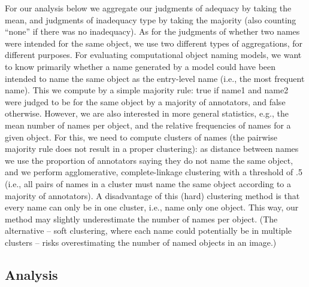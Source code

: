 For our analysis below we aggregate our judgments of adequacy by taking the mean, and judgments of inadequacy type by taking the majority (also counting ``none'' if there was no inadequacy).
As for the judgments of whether two names were intended for the same object, we use two different types of aggregations, for different purposes.
For evaluating computational object naming models, we want to know primarily whether a name generated by a model could have been intended to name the same object as the entry-level name (i.e., the most frequent name).
This we compute by a simple majority rule: true if name1 and name2 were judged to be for the same object by a majority of annotators, and false otherwise.
However, we are also interested in more general statistics, e.g., the mean number of names per object, and the relative frequencies of names for a given object.
For this, we need to compute clusters of names  (the pairwise majority rule does not result in a proper clustering): as distance between names we use the proportion of annotators saying they do not name the same object, and we perform agglomerative, complete-linkage clustering with a threshold of .5 (i.e., all pairs of names in a cluster must name the same object according to a majority of annotators).
A disadvantage of this (hard) clustering method is that every name can only be in one cluster, i.e., name only one object. 
This way, our method may slightly underestimate the number of names per object.
(The alternative -- soft clustering, where each name could potentially be in multiple clusters -- risks overestimating the number of named objects in an image.)


\subsection{Analysis}
\label{sect:mn_analysis}


